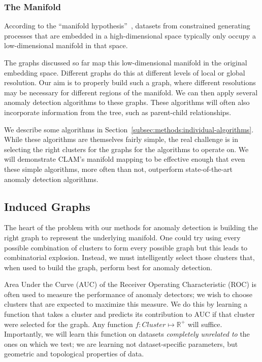 \subsubsection{The Manifold}
According to the ``manifold hypothesis''~\cite{fefferman2016testing},
datasets from constrained generating processes that are embedded in a high-dimensional space typically only occupy a low-dimensional manifold in that space.

The graphs discussed so far map this low-dimensional manifold in the original embedding space.
Different graphs do this at different levels of local or global resolution.
Our aim is to properly build such a graph, where different resolutions may be necessary for different regions of the manifold.
We can then apply several anomaly detection algorithms to these graphs.
These algorithms will often also incorporate information from the tree, such as parent-child relationships.

We describe some algorithms in Section~\ref{subsec:methods:individual-algorithms}.
While these algorithms are themselves fairly simple, the real challenge is in selecting the right clusters for the graphs for the algorithms to operate on.
We will demonstrate CLAM's manifold mapping to be effective enough that even these simple algorithms, more often than not, outperform state-of-the-art anomaly detection algorithms.


\subsection{Induced Graphs}
\label{subsec:methods:induced-graphs}

The heart of the problem with our methods for anomaly detection is building the right graph to represent the underlying manifold.
One could try using every possible combination of clusters to form every possible graph but this leads to combinatorial explosion.
Instead, we must intelligently select those clusters that, when used to build the graph, perform best for anomaly detection.

Area Under the Curve (AUC) of the Receiver Operating Characteristic (ROC) is often used to measure the performance of anomaly detectors;
we wish to choose clusters that are expected to maximize this measure.
We do this by learning a function that takes a cluster and predicts its contribution to AUC if that cluster were selected for the graph.
Any function $f: Cluster \mapsto \mathbb{R}^+$ will suffice.
Importantly, we will learn this function on datasets \emph{completely unrelated to} the ones on which we test; we are learning not dataset-specific parameters, but geometric and topological properties of data.

